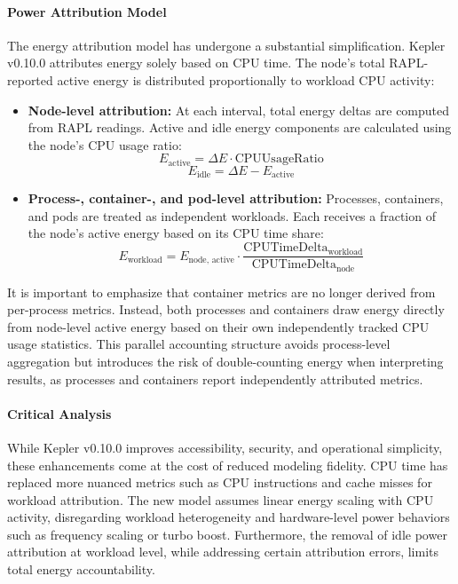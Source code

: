 \paragraph{Power Attribution Model}

The energy attribution model has undergone a substantial simplification. Kepler v0.10.0 attributes energy solely based on CPU time. The node's total RAPL-reported active energy is distributed proportionally to workload CPU activity:

\begin{itemize}
    \item \textbf{Node-level attribution:} At each interval, total energy deltas are computed from RAPL readings. Active and idle energy components are calculated using the node's CPU usage ratio:
    \begin{equation}
        E_{\text{active}} = \Delta E \cdot \text{CPUUsageRatio}
    \end{equation}
    \begin{equation}
        E_{\text{idle}} = \Delta E - E_{\text{active}}
    \end{equation}

    \item \textbf{Process-, container-, and pod-level attribution:} Processes, containers, and pods are treated as independent workloads. Each receives a fraction of the node's active energy based on its CPU time share:
    \begin{equation}
        E_{\text{workload}} = E_{\text{node, active}} \cdot \frac{\text{CPUTimeDelta}_{\text{workload}}}{\text{CPUTimeDelta}_{\text{node}}}
    \end{equation}
\end{itemize}

It is important to emphasize that container metrics are no longer derived from per-process metrics. Instead, both processes and containers draw energy directly from node-level active energy based on their own independently tracked CPU usage statistics. This parallel accounting structure avoids process-level aggregation but introduces the risk of double-counting energy when interpreting results, as processes and containers report independently attributed metrics.

\paragraph{Critical Analysis}

While Kepler v0.10.0 improves accessibility, security, and operational simplicity, these enhancements come at the cost of reduced modeling fidelity. CPU time has replaced more nuanced metrics such as CPU instructions and cache misses for workload attribution. The new model assumes linear energy scaling with CPU activity, disregarding workload heterogeneity and hardware-level power behaviors such as frequency scaling or turbo boost. Furthermore, the removal of idle power attribution at workload level, while addressing certain attribution errors, limits total energy accountability.

